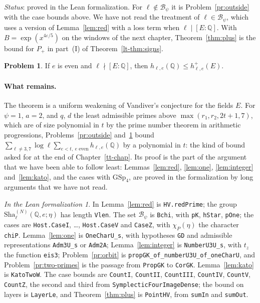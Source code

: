 \documentclass[reqno]{amsart}
\newcounter{chap}
\theoremstyle{definition}
\newtheorem{problem}{Problem}[section]
\theoremstyle{plain}
\theoremstyle{remark}
\newtheorem*{leanremark}{In the Lean formalization}
\newcommand{\Q}{\mathbb{Q}}
\newcommand{\Bc}{\mathcal{B}}
\newcommand{\Sha}{\mathrm{Sha}}
\newcommand{\tl}[1]{\texttt{#1}}
\begin{document}
\noindent\emph{Status}: proved in the Lean formalization.  For \(\ell\notin\Bc_\psi\) it is Problem~\ref{pr:outside} with the case bounds above.  We have not read the treatment of \(\ell\in\Bc_\psi\), which uses a version of Lemma~\ref{lem:red} with a loss term when \(\ell\mid[E:\Q]\).  With \(B=\exp(x^{4\varepsilon/5})\) on the windows of the next chapter, Theorem~\ref{thm:plus} is the bound for \(P_+\) in part~(I) of Theorem~\ref{lt-thm:signs}.

\begin{problem}\label{pr:Q-inside}
If \(e\) is even and \(\ell\nmid[E:\Q]\), then \(h_{\ell,e}(\Q)\le h^+_{\ell,e}(E)\).
\end{problem}

\paragraph{What remains.}
The theorem is a uniform weakening of Vandiver's conjecture for the fields \(E\).  For \(\psi=1\), \(a=2\), and \(q\), \(d\) the least admissible primes above \(\max(r_1,r_2,2t+1,7)\), which are of size polynomial in \(t\) by the prime number theorem in arithmetic progressions, Problems~\ref{pr:outside} and~\ref{pr:Q-inside} bound \(\sum_{\ell\ne3,7}\log\ell\sum_{e<t,\ e\text{ even}}h_{\ell,e}(\Q)\) by a polynomial in \(t\): the kind of bound asked for at the end of Chapter~\ref{tt-chap}.  Its proof is the part of the argument that we have been able to follow least: Lemmas~\ref{lem:red}, \ref{lem:one}, \ref{lem:integer} and~\ref{lem:kato}, and the cases with \(\mathrm{GSp}_4\), are proved in the formalization by long arguments that we have not read.

\begin{leanremark}
\raggedright In \cite{Lean} Lemma~\ref{lem:red} is \tl{HV.\allowbreak{}redPrime}; the group \(\Sha^{(N)}_\ell(\Q,e;\eta)\) has length \tl{Vlen}.  The set \(\Bc_\psi\) is \tl{Bchi}, with \tl{pK}, \tl{hStar}, \tl{pOne}; the cases are \tl{Host.\allowbreak{}CaseI}, \dots, \tl{Host.\allowbreak{}CaseV} and \tl{CaseZ}, with \(\chi_P(\eta)\) the character \tl{chiP}.  Lemma~\ref{lem:one} is \tl{OneCharU\_s}, with hypotheses \tl{GD} and admissible representations \tl{Adm3U\_s} or \tl{Adm2A}; Lemma~\ref{lem:integer} is \tl{NumberU3U\_s}, with \(t_z\) the function \tl{eis3}; Problem~\ref{pr:orbit} is \tl{propGK\_\allowbreak{}of\_\allowbreak{}numberU3U\_\allowbreak{}of\_\allowbreak{}oneCharU}, and Problem~\ref{pr:two-primes} is the passage from \tl{PropGK} to \tl{CorGK}.  Lemma~\ref{lem:kato} is \tl{KatoTwoW}.  The case bounds are \tl{CountI}, \tl{CountII}, \tl{CountIII}, \tl{CountIV}, \tl{CountV}, \tl{CountZ}, the second and third from \tl{SymplecticFourImageDense}; the bound on layers is \tl{LayerLe}, and Theorem~\ref{thm:plus} is \tl{PointHV}, from \tl{sumIn} and \tl{sumOut}.
\end{leanremark}
\end{document}

